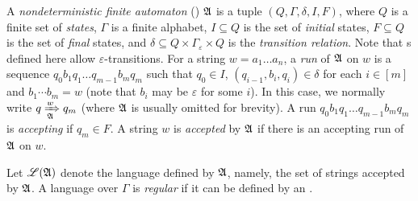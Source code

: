 
A \emph{nondeterministic finite automaton} (\NFA) ${\mathfrak{A} }$ is a tuple $(Q, \Gamma, \delta, I, F)$, where $Q$ is a finite set of \emph{states}, $\Gamma$ is a finite alphabet, $I \subseteq Q$ is the set of \emph{initial} states, $F \subseteq Q$ is the set of \emph{final} states, and $\delta \subseteq Q \times \Gamma_\varepsilon \times Q$ is the \emph{transition relation}. Note that {\NFA}s defined here allow $\varepsilon$-transitions.
%
For a string $w = a_1 \dots a_n$, a \emph{run} of ${\mathfrak{A} }$ on $w$ is a sequence $q_0 b_1q_1 \dots q_{m-1} b_m q_m$ such that $q_0 \in I$,  $(q_{i-1}, b_i, q_i) \in \delta$ for each $i \in [m]$ and $b_1 \cdots b_m = w$ (note that $b_i$ may be $\varepsilon$ for some $i$). In this case, we normally write $q \xRightarrow[{\mathfrak{A} }]{w} q_m$ 
(where ${\mathfrak{A} }$ is usually omitted %
for brevity).
%
A run $q_0 b_1q_1 \dots q_{m-1} b_m q_m$ is \emph{accepting} if $q_m \in F$. A string $w$ is \emph{accepted} by ${\mathfrak{A} }$ if there is an accepting run of ${\mathfrak{A} }$ on $w$. 

Let ${\mathscr{L} }({\mathfrak{A} })$ denote the language defined by ${\mathfrak{A} }$, namely, the set of strings accepted by ${\mathfrak{A} }$. 
%
%
A language over $\Gamma$ is \emph{regular} if it can be defined by an \NFA.
%
%

